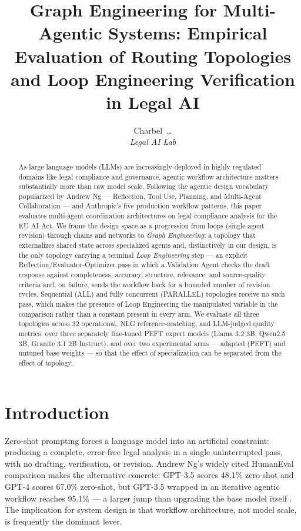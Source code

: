 \documentclass[journal,10pt,compsoc,onecolumn]{IEEEtran}
\begin{document}
\title{Graph Engineering for Multi-Agentic Systems: Empirical Evaluation of Routing Topologies and Loop Engineering Verification in Legal AI}

\author{Charbel~\dots \\
\textit{Legal AI Lab}}

\maketitle

\begin{abstract}
As large language models (LLMs) are increasingly deployed in highly regulated domains like legal compliance and governance, agentic workflow architecture matters substantially more than raw model scale. Following the agentic design vocabulary popularized by Andrew Ng --- Reflection, Tool Use, Planning, and Multi-Agent Collaboration --- and Anthropic's five production workflow patterns, this paper evaluates multi-agent coordination architectures on legal compliance analysis for the EU AI Act. We frame the design space as a progression from loops (single-agent revision) through chains and networks to \textit{Graph Engineering}: a topology that externalizes shared state across specialized agents and, distinctively in our design, is the only topology carrying a terminal \textit{Loop Engineering} step --- an explicit Reflection/Evaluator-Optimizer pass in which a Validation Agent checks the draft response against completeness, accuracy, structure, relevance, and source-quality criteria and, on failure, sends the workflow back for a bounded number of revision cycles. Sequential (ALL) and fully concurrent (PARALLEL) topologies receive no such pass, which makes the presence of Loop Engineering the manipulated variable in the comparison rather than a constant present in every arm. We evaluate all three topologies across 32 operational, NLG reference-matching, and LLM-judged quality metrics, over three separately fine-tuned PEFT expert models (Llama 3.2 3B, Qwen2.5 3B, Granite 3.1 2B Instruct), and over two experimental arms --- adapted (PEFT) and untuned base weights --- so that the effect of specialization can be separated from the effect of topology.
\end{abstract}

\section{Introduction}
Zero-shot prompting forces a language model into an artificial constraint: producing a complete, error-free legal analysis in a single uninterrupted pass, with no drafting, verification, or revision. Andrew Ng's widely cited HumanEval comparison makes the alternative concrete: GPT-3.5 scores 48.1\% zero-shot and GPT-4 scores 67.0\% zero-shot, but GPT-3.5 wrapped in an iterative agentic workflow reaches 95.1\% --- a larger jump than upgrading the base model itself \cite{ng_batch_2024, sequoia_ng_2024}. The implication for system design is that workflow architecture, not model scale, is frequently the dominant lever.
\end{document}
